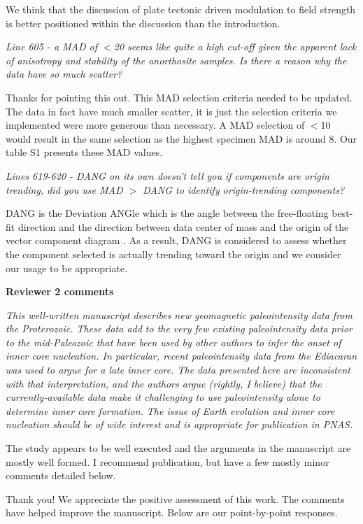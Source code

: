 \documentclass[11pt, letterpaper]{article}
\begin{document}
\begin{flushleft}
We think that the discussion of plate tectonic driven modulation to field strength is better positioned within the discussion than the introduction. 

\textit{Line 605 - a MAD of $<$20 seems like quite a high cut-off given the apparent lack of anisotropy and stability of the anorthosite samples. Is there a reason why the data have so much scatter?}

Thanks for pointing this out. This MAD selection criteria needed to be updated. The data in fact have much smaller scatter, it is just the selection criteria we implemented were more generous than necessary. A MAD selection of $<$10 would result in the same selection as the highest specimen MAD is around 8. Our table S1 presents these MAD values. 

\textit{Lines 619-620 - DANG on its own doesn't tell you if components are origin trending, did you use MAD $>$ DANG to identify origin-trending components?}

DANG is the Deviation ANGle which is the angle between the free-floating best-fit direction and the direction between data center of mass and the origin of the vector component diagram  \cite{Tauxe2004a}. As a result, DANG is considered to assess whether the component selected is actually trending toward the origin and we consider our usage to be appropriate. 

\clearpage


\textbf{\Large Reviewer 2 comments}

\itshape
This well-written manuscript describes new geomagnetic paleointensity data from the Proterozoic. These data add to the very few existing paleointensity data prior to the mid-Paleozoic that have been used by other authors to infer the onset of inner core nucleation. In particular, recent paleointensity data from the Ediacaran was used to argue for a late inner core. The data presented here are inconsistent with that interpretation, and the authors argue (rightly, I believe) that the currently-available data make it challenging to use paleointensity alone to determine inner core formation. The issue of Earth evolution and inner core nucleation should be of wide interest and is appropriate for publication in PNAS.

The study appears to be well executed and the arguments in the manuscript are mostly well formed. I recommend publication, but have a few mostly minor comments detailed below.
\upshape

Thank you! We appreciate the positive assessment of this work. The comments have helped improve the manuscript. Below are our point-by-point responses.


\end{flushleft}
\end{document}
